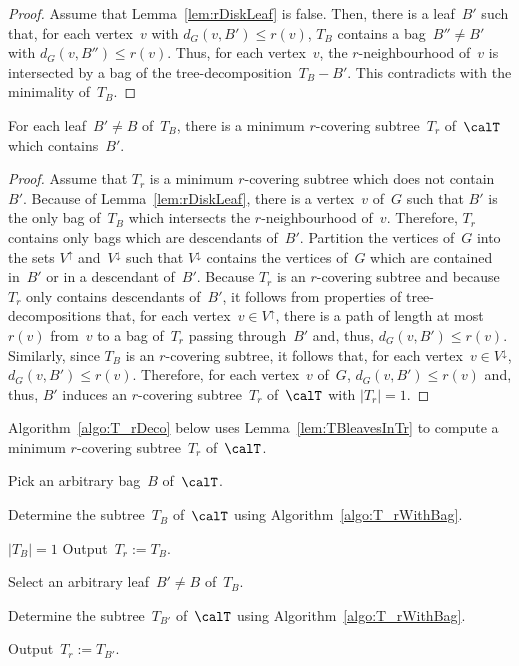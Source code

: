 \begin{proof}
Assume that Lemma~\ref{lem:rDiskLeaf} is false.
Then, there is a leaf~$B'$ such that, for each vertex~$v$ with $d_G(v, B') \leq r(v)$, $T_B$ contains a bag~$B'' \neq B'$ with $d_G(v, B'') \leq r(v)$.
Thus, for each vertex~$v$, the $r$-neighbourhood of~$v$ is intersected by a bag of the tree-decomposition~$T_B - B'$.
This contradicts with the minimality of~$T_B$.
\end{proof}

\begin{lemma}
    \label{lem:TBleavesInTr}
For each leaf~\( B' \neq B \) of~\( T_B \), there is a minimum $r$-covering subtree~\( T_r \) of~\( \calT \) which contains~\( B'\).
\end{lemma}

\begin{proof}
Assume that $T_r$ is a minimum $r$-covering subtree which does not contain~$B'$.
Because of Lemma~\ref{lem:rDiskLeaf}, there is a vertex~$v$ of~$G$ such that $B'$ is the only bag of~$T_B$ which intersects the $r$-neighbourhood of~$v$.
Therefore, $T_r$ contains only bags which are descendants of~$B'$.
Partition the vertices of~$G$ into the sets $V^\uparrow$ and~$V^\downarrow$ such that $V^\downarrow$ contains the vertices of~$G$ which are contained in~$B'$ or in a descendant of~$B'$.
Because $T_r$ is an $r$-covering subtree and because $T_r$ only contains descendants of~$B'$, it follows from properties of tree-decompositions that, for each vertex~$v \in V^\uparrow$, there is a path of length at most~$r(v)$ from~$v$ to a bag of~$T_r$ passing through~$B'$ and, thus, $d_G(v, B') \leq r(v)$.
Similarly, since $T_B$ is an $r$-covering subtree, it follows that, for each vertex~$v \in V^\downarrow$, $d_G(v, B') \leq r(v)$.
Therefore, for each vertex~$v$ of~$G$, $d_G(v, B') \leq r(v)$ and, thus, $B'$ induces an $r$-covering subtree~$T_r$ of~$\calT$ with $|T_r| = 1$.
\end{proof}

Algorithm~\ref{algo:T_rDeco} below uses Lemma~\ref{lem:TBleavesInTr} to compute a minimum $r$-covering subtree~$T_r$ of~$\calT$.

\begin{algorithm}
    [htb]
    \caption
    {%
        Computes a minimum $r$-covering subtree~$T_r$ of a given tree-decomposition~$\calT$.
    }
    \label{algo:T_rDeco}

Pick an arbitrary bag~$B$ of~$\calT$.

Determine the subtree~$T_B$ of~$\calT$ using Algorithm~\ref{algo:T_rWithBag}.

\If
{%
    \( |T_B| = 1 \)
}
{%
    Output~$T_r := T_B$.
}
\Else
{%
    Select an arbitrary leaf~$B' \neq B$ of~$T_B$.

    Determine the subtree~$T_{B'}$ of~$\calT$ using Algorithm~\ref{algo:T_rWithBag}.

    Output~$T_r := T_{B'}$.
}
\end{algorithm}

